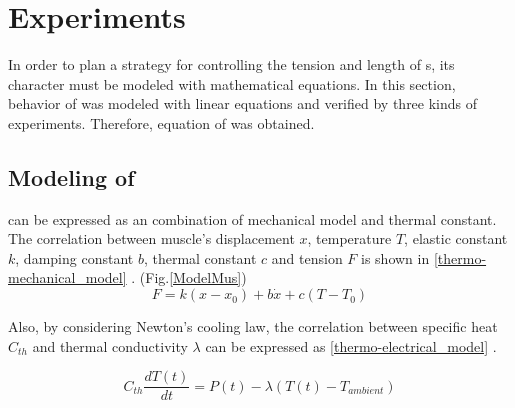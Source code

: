 \section{Experiments}\label{section_modeling}
In order to plan a strategy for controlling the tension and length of \scpnospace s, its character must be modeled with mathematical equations. In this section, behavior of \scp was modeled with linear equations and verified by three kinds of experiments. Therefore, equation of \anta was obtained.

\subsection{Modeling of \ANTA}\label{section_thermo_model}
\scp can be expressed as an combination of mechanical model and thermal constant. The correlation between muscle's displacement $x$, temperature $T$, elastic constant $k$, damping constant $b$, thermal constant $c$ and tension $F$ is shown in \eqref{thermo-mechanical_model} \cite{yip}.
(Fig.\ref{ModelMus})
\begin{equation} \label{thermo-mechanical_model}
F=k(x-x_0) + b\dot{x}+c(T-T_0)
\end{equation}

Also, by considering Newton's cooling law, the correlation between specific heat $C_{th}$ and thermal conductivity $\lambda$ can be expressed as \eqref{thermo-electrical_model} \cite{yip}.

\begin{equation} \label{thermo-electrical_model}
C_{th}\frac{dT(t)}{dt} = P(t) - \lambda(T(t)-T_{ambient})
\end{equation}

